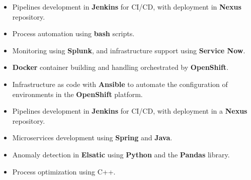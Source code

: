 \documentclass[letterpaper]{style} %
\begin{document}


\begin{itemize}
	\item Pipelines development in \textbf{Jenkins} for CI/CD, with deployment in \textbf{Nexus} repository.
	\item Process automation using \textbf{bash} scripts.
	\item Monitoring using \textbf{Splunk}, and infrastructure support using \textbf{Service Now}.
\end{itemize}


\divider

\begin{itemize}
	\item \textbf{Docker} container building and handling orchestrated by \textbf{OpenShift}.
	\item Infrastructure as code with \textbf{Ansible} to automate the configuration of environments in the \textbf {OpenShift} platform.
	\item Pipelines development in \textbf{Jenkins} for CI/CD, with deployment in a \textbf{Nexus} repository.
	\item Microservices development using \textbf{Spring} and \textbf{Java}.
	\item Anomaly detection in \textbf{Elsatic} using \textbf{Python} and the \textbf{Pandas} library.
	\item Process optimization using C++.
\end{itemize}
\end{document}
